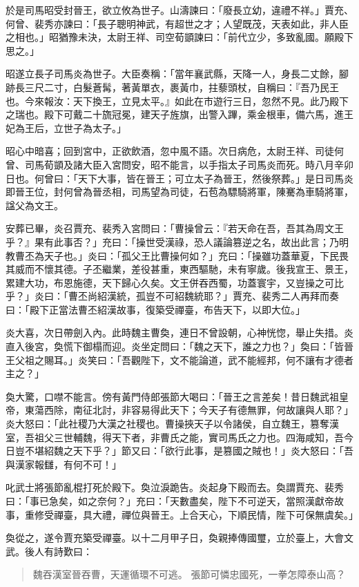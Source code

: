 於是司馬昭受封晉王，欲立攸為世子。山濤諫曰：「廢長立幼，違禮不祥。」賈充、何曾、裴秀亦諫曰：「長子聰明神武，有超世之才；人望既茂，天表如此，非人臣之相也。」昭猶豫未決，太尉王祥、司空荀顗諫曰：「前代立少，多致亂國。願殿下思之。」

昭遂立長子司馬炎為世子。大臣奏稱：「當年襄武縣，天降一人，身長二丈餘，腳跡長三尺二寸，白髮蒼髯，著黃單衣，裹黃巾，拄藜頭杖，自稱曰：『吾乃民王也。今來報汝：天下換王，立見太平。』如此在市遊行三日，忽然不見。此乃殿下之瑞也。殿下可戴二十旒冠冕，建天子旌旗，出警入蹕，乘金根車，備六馬，進王妃為王后，立世子為太子。」

昭心中暗喜；回到宮中，正欲飲酒，忽中風不語。次日病危，太尉王祥、司徒何曾、司馬荀顗及諸大臣入宮問安，昭不能言，以手指太子司馬炎而死。時八月辛卯日也。何曾曰：「天下大事，皆在晉王；可立太子為晉王，然後祭葬。」是日司馬炎即晉王位，封何曾為晉丞相，司馬望為司徒，石苞為驃騎將軍，陳騫為車騎將軍，諡父為文王。

安葬已畢，炎召賈充、裴秀入宮問曰：「曹操曾云：『若天命在吾，吾其為周文王乎？』果有此事否？」充曰：「操世受漢祿，恐人議論篡逆之名，故出此言；乃明教曹丕為天子也。」炎曰：「孤父王比曹操何如？」充曰：「操雖功蓋華夏，下民畏其威而不懷其德。子丕繼業，差役甚重，東西驅馳，未有寧歲。後我宣王、景王，累建大功，布恩施德，天下歸心久矣。文王併吞西蜀，功蓋寰宇，又豈操之可比乎？」炎曰：「曹丕尚紹漢統，孤豈不可紹魏統耶？」賈充、裴秀二人再拜而奏曰：「殿下正當法曹丕紹漢故事，復築受禪臺，布告天下，以即大位。」

炎大喜，次日帶劍入內。此時魏主曹奐，連日不曾設朝，心神恍惚，舉止失措。炎直入後宮，奐慌下御榻而迎。炎坐定問曰：「魏之天下，誰之力也？」奐曰：「皆晉王父祖之賜耳。」炎笑曰：「吾觀陛下，文不能論道，武不能經邦，何不讓有才德者主之？」

奐大驚，口噤不能言。傍有黃門侍郎張節大喝曰：「晉王之言差矣！昔日魏武祖皇帝，東蕩西除，南征北討，非容易得此天下；今天子有德無罪，何故讓與人耶？」炎大怒曰：「此社稷乃大漢之社稷也。曹操挾天子以令諸侯，自立魏王，篡奪漢室，吾祖父三世輔魏，得天下者，非曹氏之能，實司馬氏之力也。四海咸知，吾今日豈不堪紹魏之天下乎？」節又曰：「欲行此事，是篡國之賊也！」炎大怒曰：「吾與漢家報讎，有何不可！」

叱武士將張節亂棍打死於殿下。奐泣淚跪告。炎起身下殿而去。奐謂賈充、裴秀曰：「事已急矣，如之奈何？」充曰：「天數盡矣，陛下不可逆天，當照漢獻帝故事，重修受禪臺，具大禮，禪位與晉王。上合天心，下順民情，陛下可保無虞矣。」

奐從之，遂令賈充築受禪臺。以十二月甲子日，奐親捧傳國璽，立於臺上，大會文武。後人有詩歎曰：

\begin{quote}
魏吞漢室晉吞曹，天運循環不可逃。
張節可憐忠國死，一拳怎障泰山高？
\end{quote}

